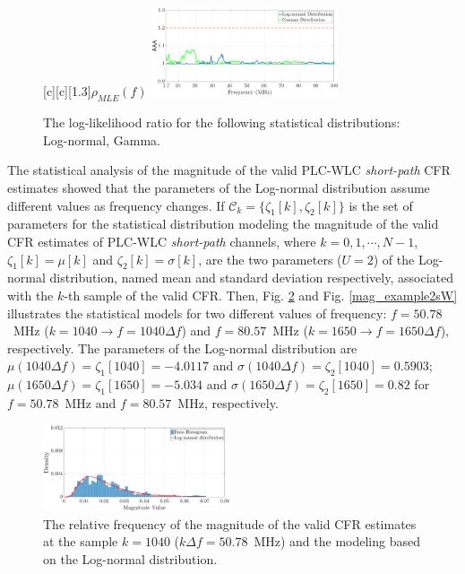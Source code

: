 \documentclass[journal]{IEEEtran}
\begin{document}
\begin{figure}[h!]
	\centering
	[c][1.3]{$\rho_{MLE} (f)$}
	\includegraphics[width=0.49\textwidth]{images/Log_Lognormal_GammasW.eps}
	\caption{The log-likelihood ratio for the following statistical distributions: Log-normal, Gamma.}
	\label{fig:Log_likesW}
\end{figure}


The statistical analysis of the magnitude of the valid \ac{PLC}-\ac{WLC} \textit{short-path} \ac{CFR} estimates showed that the parameters of the Log-normal distribution assume different values as frequency changes. If $\mathcal{C}_{k} = \{\zeta_1[k],\zeta_2[k]\}$ is the set of parameters for the statistical distribution modeling the magnitude of the valid \ac{CFR} estimates of \ac{PLC}-\ac{WLC} \textit{short-path} channels, where $k=0,1,\cdots,N-1$,  $\zeta_1[k] = \mu[k]$ and $\zeta_2[k] = \sigma[k]$, are the two parameters ($U=2$) of the Log-normal distribution, named mean and standard deviation respectively, associated with the $k$-th sample of the valid \ac{CFR}. Then, Fig. \ref{mag_examplesW} and Fig. \ref{mag_example2sW} illustrates the statistical models for two different values of frequency: $f=50.78$~MHz ($k=1040 \rightarrow f = 1040\Delta f$) and $f=80.57$~MHz ($k=1650 \rightarrow f = 1650\Delta f$), respectively. The parameters of the Log-normal distribution are  $\mu(1040 \Delta f) = \zeta_1[1040]=-4.0117$ and $\sigma( 1040 \Delta f) = \zeta_2[1040] = 0.5903$; $\mu(1650 \Delta f) = \zeta_1[1650] = -5.034$ and $\sigma( 1650 \Delta f) = \zeta_2[1650]=0.82$ for $f=50.78$~MHz and $f=80.57$~MHz, respectively.

\begin{figure}[h!]
	\centering
	\includegraphics[width=0.49\textwidth]{images/Mag_histsW_2.eps}
	\caption{The relative frequency of the magnitude of the valid CFR estimates at the sample $k = 1040$ ($k\Delta f= 50.78$~MHz) and the modeling based on the Log-normal distribution.}
	\label{mag_examplesW}
\end{figure}
\end{document}
